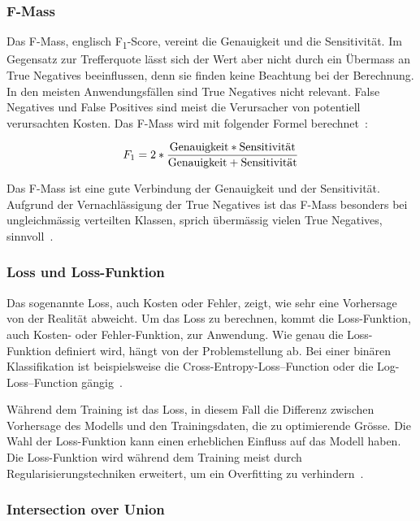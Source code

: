 \subsubsection{F-Mass}
\label{chap:f1-score}

Das F-Mass, englisch F\textsubscript{1}-Score, vereint die Genauigkeit und die Sensitivität. Im Gegensatz zur Trefferquote lässt sich der Wert aber nicht durch ein Übermass an True Negatives beeinflussen, denn sie finden keine Beachtung bei der Berechnung. In den meisten Anwendungsfällen sind True Negatives nicht relevant. False Negatives und False Positives sind meist die Verursacher von potentiell verursachten Kosten. Das F-Mass wird mit folgender Formel berechnet~\autocite{TDSAccuracy}:

\nopagebreak

$$F_1=2 * \frac{\textnormal{Genauigkeit} * \textnormal{Sensitivität}}{\textnormal{Genauigkeit} + \textnormal{Sensitivität}}$$
\vspace*{0.2cm}

Das F-Mass ist eine gute Verbindung der Genauigkeit und der Sensitivität. Aufgrund der Vernachlässigung der True Negatives ist das F-Mass besonders bei ungleichmässig verteilten Klassen, sprich übermässig vielen True Negatives, sinnvoll~\autocite{TDSAccuracy}.

\subsubsection{Loss und Loss-Funktion}

Das sogenannte Loss, auch Kosten oder Fehler, zeigt, wie sehr eine Vorhersage von der Realität abweicht. Um das Loss zu berechnen, kommt die Loss-Funktion, auch Kosten- oder Fehler-Funktion, zur Anwendung. Wie genau die Loss-Funktion definiert wird, hängt von der Problemstellung ab. Bei einer binären Klassifikation ist beispielsweise die Cross-Entropy-Loss–Function oder die Log-Loss–Function gängig~\autocite{TDSLoss}. 

Während dem Training ist das Loss, in diesem Fall die Differenz zwischen Vorhersage des Modells und den Trainingsdaten, die zu optimierende Grösse. Die Wahl der Loss-Funktion kann einen erheblichen Einfluss auf das Modell haben. Die Loss-Funktion wird während dem Training meist durch Regularisierungstechniken erweitert, um ein Overfitting zu verhindern~\autocite{Goodfellow2016}.

\subsubsection{Intersection over Union}

